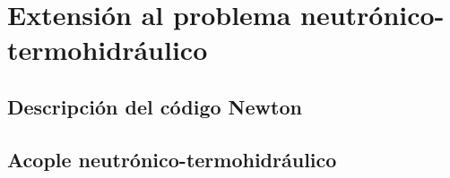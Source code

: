 \chapter{Extensión al problema neutrónico-termohidráulico}

\section{Descripción del código Newton}
\label{5:newton}

\section{Acople neutrónico-termohidráulico}
\label{5:neut-th}